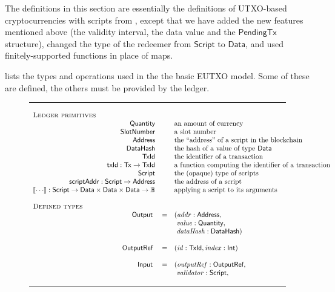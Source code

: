 \documentclass[a4paper]{article}
\newcommand{\s}{\textsf}  %
\newcommand{\msf}[1]{\ensuremath{\mathsf{#1}}}
\newcommand{\mi}[1]{\ensuremath{\mathit{#1}}}
\newcommand\rfskip{7pt}
\newenvironment{ruledfigure}[1]{\begin{figure}[#1]\hrule\vspace{\rfskip}}{\vspace{\rfskip}\hrule\end{figure}}
\newcommand{\script}{\ensuremath{\s{Script}}}
\newcommand{\scriptAddr}{\msf{scriptAddr}}
\newcommand{\ptx}{\ensuremath{\s{PendingTx}}}
\newcommand{\TxId}{\ensuremath{\s{TxId}}}
\newcommand{\txId}{\msf{txId}}
\newcommand{\txrefid}{\mi{id}}
\newcommand{\Address}{\ensuremath{\s{Address}}}
\newcommand{\DataHash}{\ensuremath{\s{DataHash}}}
\newcommand{\idx}{\mi{index}}
\newcommand{\addr}{\mi{addr}}
\newcommand{\val}{\mi{value}}  %
\newcommand{\validator}{\mi{validator}}
\newcommand{\dataHsh}{\mi{dataHash}}
\newcommand{\Data}{\ensuremath{\s{Data}}}
\newcommand{\outputref}{\mi{outputRef}}
\newcommand{\slotnum}{\ensuremath{\s{SlotNumber}}}
\newcommand{\eutxotx}{\msf{Tx}}
\newcommand{\qty}{\ensuremath{\s{Quantity}}}
\newcommand\B{\ensuremath{\mathbb{B}}}
\begin{document}
The definitions in this section are essentially the definitions of
UTXO-based cryptocurrencies with scripts from
\citep{Zahnentferner18-UTxO}, except that we have added the new
features mentioned above (the validity interval, the data value
and the \ptx{} structure), changed the type of the redeemer from
\script{} to \Data{}, and used finitely-supported functions in place
of maps.

 lists the types and operations used in the
the basic EUTXO model. Some of these are defined, the others must be provided by
the ledger.
\begin{ruledfigure}{H}
  \begin{displaymath}
  \begin{array}{rll}
    \multicolumn{3}{l}{\textsc{Ledger primitives}}\\
    \qty{} && \mbox{an amount of currency}\\
    \slotnum && \mbox{a slot number}\\
    \Address && \mbox{the ``address'' of a script in the blockchain}\\
    \DataHash && \mbox{the hash of a value of type \Data{}}\\
    \TxId && \mbox{the identifier of a transaction}\\
    \txId : \eutxotx \rightarrow \TxId && \mbox{a function computing the identifier of a transaction}\\
    \script && \mbox{the (opaque) type of scripts}\\
    \scriptAddr : \script \rightarrow \Address && \mbox{the address of a script}\\
    \llbracket \cdots \rrbracket : \script \rightarrow \Data \times \Data \times
    \Data \rightarrow \B && \mbox{applying a script to its arguments}\\
    \\
    \multicolumn{3}{l}{\textsc{Defined types}}\\
    \s{Output } &=&(\addr: \Address,\\
                & &\ \val: \qty,\\
                & &\ \dataHsh: \DataHash)\\
    \\
    \s{OutputRef } &=&(\txrefid: \TxId, \idx: \s{Int})\\
    \\
    \s{Input } &=&(\outputref: \s{OutputRef},\\
               & &\ \validator: \script,\\

\end{array}
\end{displaymath}
\end{ruledfigure}
\end{document}
